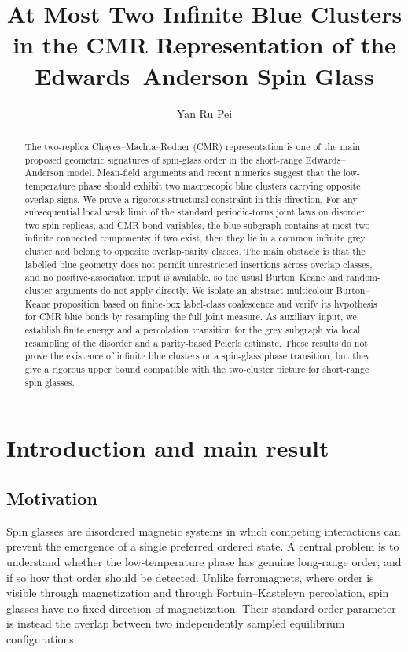 \documentclass[11pt]{article}
\title{At Most Two Infinite Blue Clusters in the CMR Representation of the Edwards--Anderson Spin Glass}
\author{Yan Ru Pei}
\date{}
\numberwithin{theorem}{section}
\theoremstyle{remark}
\begin{document}
\maketitle

\begin{abstract}
The two-replica Chayes--Machta--Redner (CMR) representation is one of the main proposed geometric signatures of spin-glass order in the short-range Edwards--Anderson model. Mean-field arguments and recent numerics suggest that the low-temperature phase should exhibit two macroscopic blue clusters carrying opposite overlap signs. We prove a rigorous structural constraint in this direction. For any subsequential local weak limit of the standard periodic-torus joint laws on disorder, two spin replicas, and CMR bond variables, the blue subgraph contains at most two infinite connected components; if two exist, then they lie in a common infinite grey cluster and belong to opposite overlap-parity classes. The main obstacle is that the labelled blue geometry does not permit unrestricted insertions across overlap classes, and no positive-association input is available, so the usual Burton--Keane and random-cluster arguments do not apply directly. We isolate an abstract multicolour Burton--Keane proposition based on finite-box label-class coalescence and verify its hypothesis for CMR blue bonds by resampling the full joint measure. As auxiliary input, we establish finite energy and a percolation transition for the grey subgraph via local resampling of the disorder and a parity-based Peierls estimate. These results do not prove the existence of infinite blue clusters or a spin-glass phase transition, but they give a rigorous upper bound compatible with the two-cluster picture for short-range spin glasses.
\end{abstract}

\section{Introduction and main result}\label{sec:intro}

\subsection{Motivation}

Spin glasses are disordered magnetic systems in which competing interactions can prevent the emergence of a single preferred ordered state.
A central problem is to understand whether the low-temperature phase has genuine long-range order, and if so how that order should be detected.
Unlike ferromagnets, where order is visible through magnetization and through Fortuin--Kasteleyn percolation, spin glasses have no fixed direction of magnetization.
Their standard order parameter is instead the overlap between two independently sampled equilibrium configurations.
\end{document}
